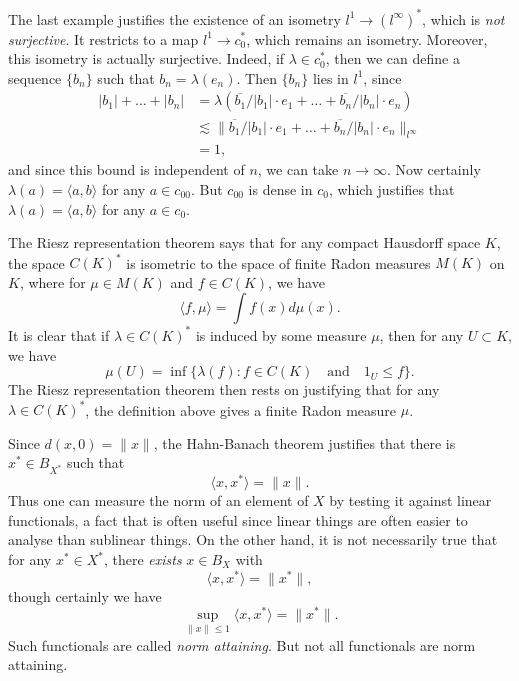 \begin{example}
    The last example justifies the existence of an isometry $l^1 \to (l^\infty)^*$, which is \emph{not surjective}. It restricts to a map $l^1 \to c_0^*$, which remains an isometry. Moreover, this isometry is actually surjective. Indeed, if $\lambda \in c_0^*$, then we can define a sequence $\{ b_n \}$ such that $b_n = \lambda(e_n)$. Then $\{ b_n \}$ lies in $l^1$, since
    \begin{align*}
        |b_1| + \dots + |b_n| &= \lambda \left( \overline{b_1} / |b_1| \cdot e_1 + \dots + \overline{b_n} / |b_n| \cdot e_n \right)\\
        &\lesssim \| \overline{b_1} / |b_1| \cdot e_1 + \dots + \overline{b_n} / |b_n| \cdot e_n \|_{l^\infty}\\
        &= 1,
    \end{align*}
    and since this bound is independent of $n$, we can take $n \to \infty$. Now certainly $\lambda(a) = \langle a, b \rangle$ for any $a \in c_{00}$. But $c_{00}$ is dense in $c_0$, which justifies that $\lambda(a) = \langle a, b \rangle$ for any $a \in c_0$.
\end{example}

\begin{example}
    The Riesz representation theorem says that for any compact Hausdorff space $K$, the space $C(K)^*$ is isometric to the space of finite Radon measures $M(K)$ on $K$, where for $\mu \in M(K)$ and $f \in C(K)$, we have
    \[ \langle f, \mu \rangle = \int f(x) d\mu(x). \]
    It is clear that if $\lambda \in C(K)^*$ is induced by some measure $\mu$, then for any $U \subset K$, we have
    \[ \mu(U) = \inf \{ \lambda(f): f \in C(K) \quad\text{and}\quad 1_U \leq f \}. \]
    The Riesz representation theorem then rests on justifying that for any $\lambda \in C(K)^*$, the definition above gives a finite Radon measure $\mu$.
\end{example}

Since $d(x,0) = \| x \|$, the Hahn-Banach theorem justifies that there is $x^* \in B_{X^*}$ such that
%
\[ \langle x, x^* \rangle = \| x \|. \]
%
Thus one can measure the norm of an element of $X$ by testing it against linear functionals, a fact that is often useful since linear things are often easier to analyse than sublinear things. On the other hand, it is not necessarily true that for any $x^* \in X^*$, there \emph{exists} $x \in B_X$ with
%
\[ \langle x, x^* \rangle = \| x^* \|, \]
%
though certainly we have
%
\[ \sup_{\| x \| \leq 1} \langle x, x^* \rangle = \| x^* \|. \]
%
Such functionals are called \emph{norm attaining}. But not all functionals are norm attaining.

